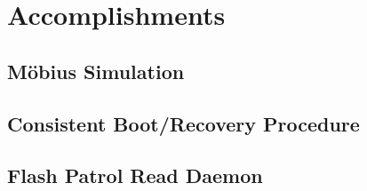 \section{Accomplishments}

\subsection{M\"obius Simulation}


\subsection{Consistent Boot/Recovery Procedure}


\subsection{Flash Patrol Read Daemon}

